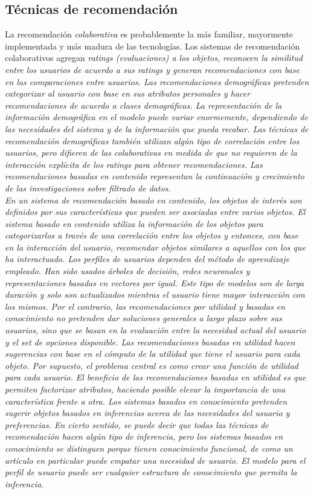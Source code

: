  	\subsection{Técnicas de recomendación}
	 	La recomendación \emph{colaborativa} es probablemente la más familiar, mayormente implementada y más madura de las tecnologías. Los sistemas de recomendación colaborativos agregan \it{ratings} (evaluaciones) a los objetos, reconocen la similitud entre los usuarios de acuerdo a sus \it{ratings} y generan recomendaciones con base en las comparaciones entre usuarios.
	 	Las recomendaciones \emph{demográficas} pretenden categorizar al usuario con base en sus atributos personales y hacer recomendaciones de acuerdo a clases demográficas. La representación de la información demográfica en el modelo puede variar enormemente, dependiendo de las necesidades del sistema y de la información que pueda recabar. Las técnicas de recomendación demográficas también utilizan algún tipo de correlación entre los usuarios, pero difieren de las colaborativas en medida de que no requieren de la interacción explícita de los ratings para obtener recomendaciones. 
	 	Las recomendaciones \emph{basadas en contenido} representan la continuación y crecimiento de las investigaciones sobre filtrado de datos.\\ En un sistema de recomendación basado en contenido, los objetos de interés son definidos por sus características que pueden ser asociadas entre varios objetos. El sistema basado en contenido utiliza la información de los objetos para categorizarlos a través de una correlación entre los objetos y entonces, con base en la interacción del usuario, recomendar objetos similares a aquellos con los que ha interactuado. Los perfiles de usuarios dependen del método de aprendizaje empleado. Han sido usados árboles de decisión, redes neuronales y representaciones basadas en vectores por igual. Este tipo de modelos son de larga duración y solo son actualizados mientras el usuario tiene mayor interacción con los mismos.
	 	Por el contrario, las recomendaciones \emph{por utilidad} y \emph{basadas en conocimiento} no pretenden dar soluciones generales a largo plazo sobre sus usuarios, sino que se basan en la evaluación entre la necesidad actual del usuario y el set de opciones disponible. Las recomendaciones basadas en utilidad hacen sugerencias con base en el cómputo de la utilidad que tiene el usuario para cada objeto. Por supuesto, el problema central es como crear una función de utilidad para cada usuario. El beneficio de las recomendaciones basadas en utilidad es que permiten factorizar atributos, haciendo posible elevar la importancia de una característica frente a otra. 
	 	Los sistemas \emph{basados en conocimiento} pretenden sugerir objetos basados en inferencias acerca de las necesidades del usuario y preferencias. En cierto sentido, se puede decir que todas las técnicas de recomendación hacen algún tipo de inferencia, pero los sistemas basados en conocimiento se distinguen porque tienen conocimiento funcional, de como un artículo en particular puede empatar una necesidad de usuario. El modelo para el perfil de usuario puede ser cualquier estructura de conocimiento que permita la inferencia. \cite{5}

